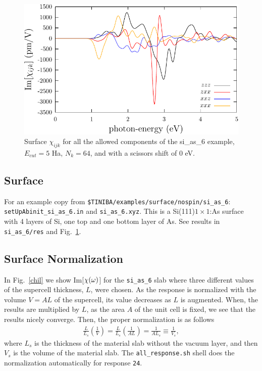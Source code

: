 \documentclass[12pt]{article}
\numberwithin{equation}{section}
\begin{document}
\begin{figure}[t]
\begin{center}
\includegraphics[scale=0.5]{plots/shg-surface}
\end{center}
\caption{Surface $\chi_{ijk}$ for all the allowed components of the
  si\_as\_6 example, $E_{cut}=5$ 
  Ha, $N_k=64$, and with a scissors shift of 0 eV. 
}
\label{shg-surface}
\end{figure}
\subsection{Surface}  
For an example copy from \verb=$TINIBA/examples/surface/nospin/si_as_6=:\\
\verb=setUpAbinit_si_as_6.in= and \verb=si_as_6.xyz=. This is a
Si(111)$1\times 1$:As surface with 4 layers of Si, one top and one bottom
layer of As. See results in \verb=si_as_6/res= and Fig.~\ref{shg-surface}.
\subsection{Surface Normalization}  
In Fig.~\ref{chil} we show Im[$\chi(\omega)$] for the 
\verb=si_as_6=
 slab where three
different values of the supercell thickness, $L$, were chosen. As the
response is normalized with the volume $V=AL$ of the supercell, its value
decreases as $L$ is augmented. When, the results are multiplied by
$L$, as the area $A$ of the unit cell is fixed, we see that the
results  nicely converge. Then, the proper normalization is as follows
\begin{align}\label{m1}
\frac{L}{L_s}\left(\frac{1}{V}\right) 
=
\frac{L}{L_s}\left(\frac{1}{AL}\right) 
=\frac{1}{AL_s}\equiv\frac{1}{V_s}
,
\end{align}
where $L_s$ is the thickness of the material slab without the vacuum
layer, and then $V_s$ is the volume of the material slab. The 
\verb=all_response.sh= shell does the normalization automatically for
response \verb=24=.
\end{document}
